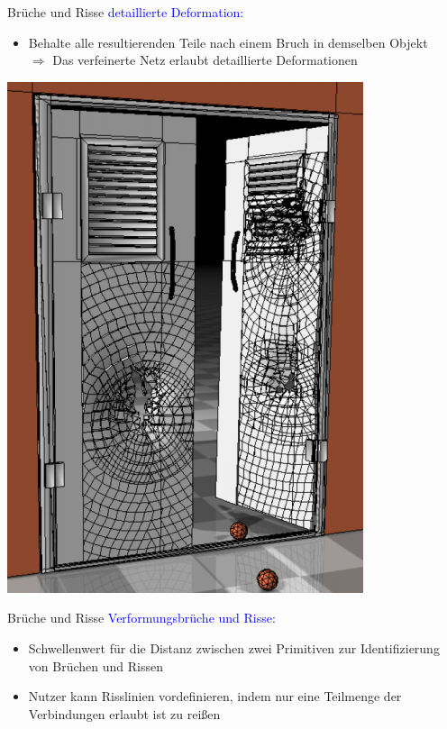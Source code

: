 \documentclass[t]{beamer}
\begin{document}
	\begin{frame}{Brüche und Risse}
		\textcolor{blue}{detaillierte Deformation:}
		\begin{minipage}{0.5\textwidth}
			\begin{itemize}
				\item Behalte alle resultierenden Teile nach einem Bruch in demselben Objekt\\
				$\Rightarrow$ Das verfeinerte Netz erlaubt detaillierte Deformationen
			\end{itemize}
		\end{minipage}\begin{minipage}{0.5\textwidth}
			\centering
			\includegraphics[scale = 0.35]{Door1.png}
	\end{minipage}

	\end{frame}
	
	\begin{frame}{Brüche und Risse}
		\textcolor{blue}{Verformungsbrüche und Risse:}
		\begin{itemize}
			\item Schwellenwert für die Distanz zwischen zwei Primitiven zur Identifizierung von Brüchen und Rissen
			\item Nutzer kann Risslinien vordefinieren, indem nur eine Teilmenge der Verbindungen erlaubt ist zu reißen
		\end{itemize}
	\end{frame}
\end{document}
